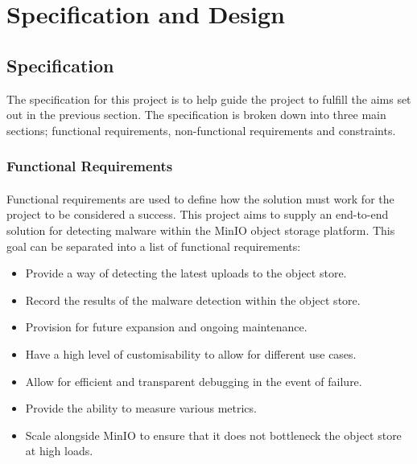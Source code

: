 \documentclass[12pt, conference, final, a4paper, onecolumn, compsoc]{IEEEtran}
\begin{document}
    \subsection*{} %


    \section{Specification and Design}

    \subsection*{Specification}

    The specification for this project is to help guide the project to fulfill
    the aims set out in the previous section. The specification is broken down
    into three main sections; functional requirements, non-functional
    requirements and constraints.

    \subsubsection*{Functional Requirements}
    \paragraph{}

    Functional requirements are used to define how the solution must work for
    the project to be considered a success. This project aims to supply an
    end-to-end solution for detecting malware within the MinIO object storage
    platform. This goal can be separated into a list of functional requirements:

    \begin{itemize}
      \item Provide a way of detecting the latest uploads to the object store.
      \item Record the results of the malware detection within the object store.
      \item Provision for future expansion and ongoing maintenance.
      \item Have a high level of customisability to allow for different use
            cases.
      \item Allow for efficient and transparent debugging in the event of
            failure.
      \item Provide the ability to measure various metrics.
      \item Scale alongside MinIO to ensure that it does not bottleneck the
            object store at high loads.
    \end{itemize}
\end{document}
